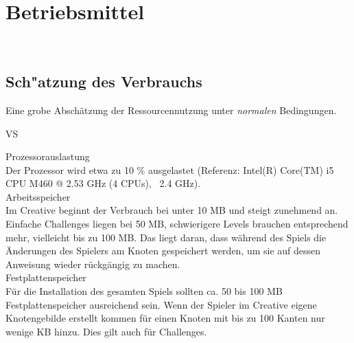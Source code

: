 %
%


\chapter{Betriebsmittel}
\label{BM}~\\

\section{Sch{"a}tzung des Verbrauchs}
\label{BM:Verbrauch}

Eine grobe Abschätzung der Ressourcennutzung unter \textit{normalen} Bedingungen.\\

\begin{ids}{\gls{VS}}

	\id[10] Prozessorauslastung \hfill\\
	
	Der Prozessor wird etwa zu 10 \% ausgelastet (Referenz: Intel(R) Core(TM) i5 CPU M460 @ 2.53 GHz (4 CPUs), ~2.4 GHz).\\
	
	\id[20] Arbeitsspeicher \hfill\\
	
	Im Creative beginnt der Verbrauch bei unter 10 MB und steigt zunehmend an. Einfache Challenges liegen bei 50 MB, schwierigere Levels brauchen entsprechend mehr, vielleicht bis zu 100 MB. Das liegt daran, dass während des Spiels die Änderungen des Spielers am Knoten gespeichert werden, um sie auf dessen Anweisung wieder rückgängig zu machen.\\
	
	
	\id[30] Festplattenspeicher \hfill\\
		
	Für die Installation des gesamten Spiels sollten ca. 50 bis 100 MB Festplattenspeicher ausreichend sein. Wenn der Spieler im Creative eigene Knotengebilde erstellt kommen für einen Knoten mit bis zu 100 Kanten nur wenige KB hinzu. Dies gilt auch für Challenges.\\

\end{ids}


